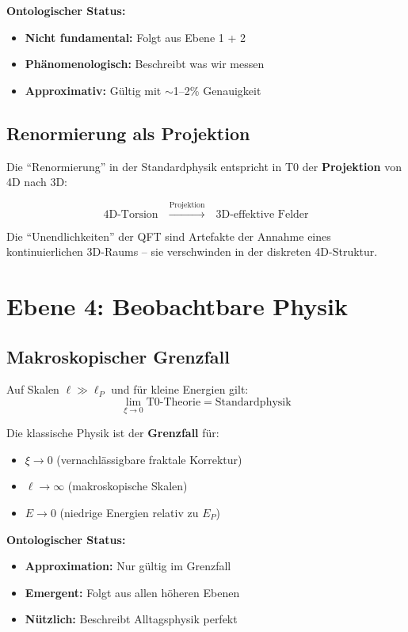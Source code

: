 	\textbf{Ontologischer Status:}
	\begin{itemize}
		\item \textbf{Nicht fundamental:} Folgt aus Ebene 1 + 2
		\item \textbf{Phänomenologisch:} Beschreibt was wir messen
		\item \textbf{Approximativ:} Gültig mit $\sim$1--2\% Genauigkeit
	\end{itemize}
	
	\subsection{Renormierung als Projektion}
	
	Die \enquote{Renormierung} in der Standardphysik entspricht in T0 der \textbf{Projektion} von 4D nach 3D:
	
	\begin{equation}
		\text{4D-Torsion} \quad \xrightarrow{\text{Projektion}} \quad \text{3D-effektive Felder}
	\end{equation}
	
	Die \enquote{Unendlichkeiten} der QFT sind Artefakte der Annahme eines kontinuierlichen 3D-Raums -- sie verschwinden in der diskreten 4D-Struktur.
	
	\section{Ebene 4: Beobachtbare Physik}
	
	\subsection{Makroskopischer Grenzfall}
	
	Auf Skalen $\ell \gg \ell_P$ und für kleine Energien gilt:
	\begin{equation}
		\lim_{\xi \to 0} \text{T0-Theorie} = \text{Standardphysik}
	\end{equation}
	
	Die klassische Physik ist der \textbf{Grenzfall} für:
	\begin{itemize}
		\item $\xi \to 0$ (vernachlässigbare fraktale Korrektur)
		\item $\ell \to \infty$ (makroskopische Skalen)
		\item $E \to 0$ (niedrige Energien relativ zu $E_P$)
	\end{itemize}
	
	\textbf{Ontologischer Status:}
	\begin{itemize}
		\item \textbf{Approximation:} Nur gültig im Grenzfall
		\item \textbf{Emergent:} Folgt aus allen höheren Ebenen
		\item \textbf{Nützlich:} Beschreibt Alltagsphysik perfekt
	\end{itemize}
	
